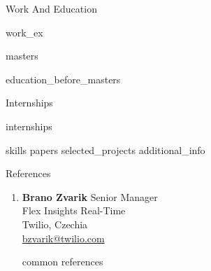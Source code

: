 \documentclass{resume} %
\begin{document}


\begin{rSection}{Work And Education}

    {work_ex}
    
    {masters}
    
    {education_before_masters}

\end{rSection}


\begin{rSection}{Internships}

    {internships}

\end{rSection}


{skills}
{papers}
{selected_projects}
{additional_info}


\begin{rSection}{References}

    \begin{enumerate}
        \item \textbf{Brano Zvarik} \hfill {Senior Manager}\\
            Flex Insights Real-Time\\
            Twilio, Czechia\\
            \faEnvelope \hspace{0.5mm}
            \href{mailto:bzvarik@twilio.com}{bzvarik@twilio.com}
    
        {common references}
    \end{enumerate}

\end{rSection}
\end{document}

